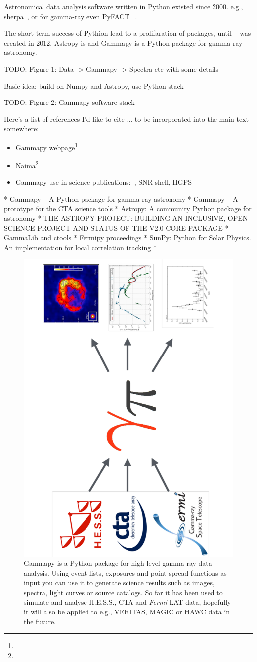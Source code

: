 Astronomical data analysis software written in Python existed since 2000. e.g.,
sherpa~\citep{sherpa-2011, sherpa-2009}, or for gamma-ray even PyFACT
~\citep{pyfact}.

The short-term success of Pythion lead to a prolifaration of packages, until
\astropy~\citep{astropy} was created in 2012. Astropy is and Gammapy is a
Python package for gamma-ray astronomy.



TODO: Figure 1: Data -> Gammapy -> Spectra etc with some details

Basic idea: build on Numpy and Astropy, use Python stack

TODO: Figure 2: Gammapy software stack

Here's a list of references I'd like to cite ... to be incorporated into the
main text somewhere:

\begin{itemize}
	\item Gammapy webpage\footnote{\GammapyUrl}
	\item Naima\footnote{\NaimaUrl}~\citep{Naima}
	\item Gammapy use in science publications:~\citep{Owen2015}, SNR shell, HGPS
\end{itemize}

* Gammapy – A Python package for gamma-ray astronomy
* Gammapy – A prototype for the CTA science tools
* Astropy: A community Python package for astronomy
* THE ASTROPY PROJECT: BUILDING AN INCLUSIVE, OPEN-SCIENCE PROJECT AND STATUS
OF THE V2.0 CORE PACKAGE * GammaLib and ctools * Fermipy proceedings * SunPy:
Python for Solar Physics. An implementation for local correlation tracking *

\begin{figure}[t]
	\centering
	\includegraphics[height=0.5\textwidth,
		angle=270]{static/gammapy-big-picture} \caption{ Gammapy is a Python package
		for high-level gamma-ray data analysis. Using event lists, exposures and point
		spread functions as input you can use it to generate science results such as
		images, spectra, light curves or source catalogs. So far it has been used to
		simulate and analyse H.E.S.S., CTA and \textit{Fermi}-LAT data, hopefully it
		will also be applied to e.g., VERITAS, MAGIC or HAWC data in the future. }
	\label{fig:big-picture}

\end{figure}


